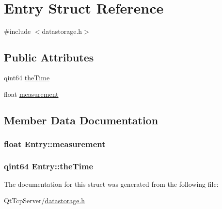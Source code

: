 \hypertarget{struct_entry}{}\section{Entry Struct Reference}
\label{struct_entry}


{\ttfamily \#include $<$datastorage.\+h$>$}

\subsection*{Public Attributes}
\begin{DoxyCompactItemize}
\item 
qint64 \hyperlink{struct_entry_a0a78d616ccc342ef6c34d849288d7c85}{the\+Time}
\item 
float \hyperlink{struct_entry_a78ebc6241b1baaa2551b2cf89f519960}{measurement}
\end{DoxyCompactItemize}


\subsection{Member Data Documentation}
\subsubsection[{\texorpdfstring{measurement}{measurement}}]{\setlength{\rightskip}{0pt plus 5cm}float Entry\+::measurement}\hypertarget{struct_entry_a78ebc6241b1baaa2551b2cf89f519960}{}\label{struct_entry_a78ebc6241b1baaa2551b2cf89f519960}
\subsubsection[{\texorpdfstring{the\+Time}{theTime}}]{\setlength{\rightskip}{0pt plus 5cm}qint64 Entry\+::the\+Time}\hypertarget{struct_entry_a0a78d616ccc342ef6c34d849288d7c85}{}\label{struct_entry_a0a78d616ccc342ef6c34d849288d7c85}


The documentation for this struct was generated from the following file\+:\begin{DoxyCompactItemize}
\item 
Qt\+Tcp\+Server/\hyperlink{datastorage_8h}{datastorage.\+h}\end{DoxyCompactItemize}
